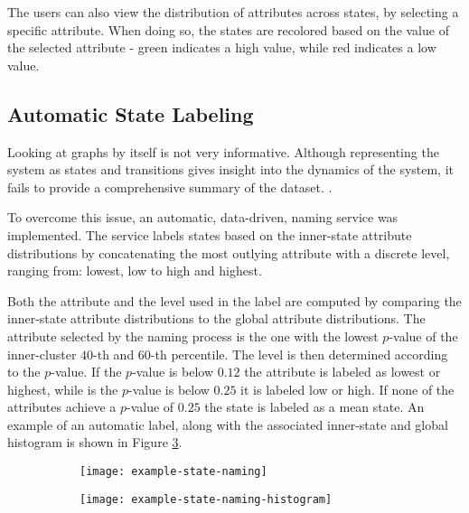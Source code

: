 The users can also view the distribution of attributes across states, by selecting a specific attribute.
When doing so, the states are recolored based on the value of the selected attribute - green indicates
a high value, while red indicates a low value.

\subsection{Automatic State Labeling}

Looking at graphs by itself is not very informative. Although representing the system as states and 
transitions gives insight into the dynamics of the system, it fails to provide a comprehensive summary 
of the dataset. .

To overcome this issue, an automatic, data-driven, naming service was implemented. The service labels
states based on the inner-state attribute distributions by concatenating the most outlying attribute
with a discrete level, ranging from: lowest, low to high and highest.

Both the attribute and the level used in the label are computed by comparing the inner-state attribute
distributions to the global attribute distributions. The attribute selected by the naming process is
the one with the lowest $p$-value of the inner-cluster $40$-th and $60$-th percentile. The level is
then determined according to the $p$-value. If the $p$-value is below $0.12$ the attribute is labeled
as lowest or highest, while is the $p$-value is below $0.25$ it is labeled low or high. If none of the
attributes achieve a $p$-value of $0.25$ the state is labeled as a mean state. An example of an automatic
label, along with the associated inner-state and global histogram is shown in Figure \ref{fig:example-naming}.

\begin{figure}[h!]
	\centering
	\begin{subfigure}{.48\columnwidth}
	  	\centering
	  	\texttt{[image: example-state-naming]}
  		\caption{\label{fig:example-naming-label}}
	\end{subfigure}
	\begin{subfigure}{.48\columnwidth}
	  	\centering
	  	\texttt{[image: example-state-naming-histogram]}
	  	\caption{\label{fig:example-naming-histogram}}
	\end{subfigure}
	\caption{\lstopar{[TODO]}}
	\label{fig:example-naming}
\end{figure}

